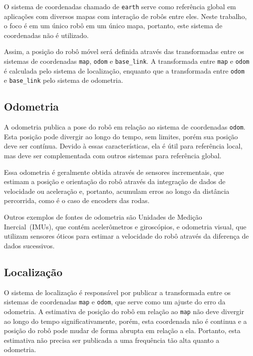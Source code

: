 \documentclass[repeatfields,xlists,xpacks,oneside,yearsonly]{ufrgscca}
\begin{document}
O sistema de coordenadas chamado de \texttt{earth} serve como
referência global em aplicações com diversos mapas com interação de
robôs entre eles. Neste trabalho, o foco é em um único robô em um
único mapa, portanto, este sistema de coordenadas não é utilizado.

Assim, a posição do robô móvel será definida através das
transformadas entre os sistemas de coordenadas \texttt{map},
\texttt{odom} e \texttt{base\_link}. A transformada entre
\texttt{map} e \texttt{odom} é calculada pelo sistema de localização,
enquanto que a transformada entre \texttt{odom} e \texttt{base\_link}
pelo sistema de odometria.


\subsection{Odometria}

A odometria publica a pose do robô em relação ao sistema de
coordenadas \texttt{odom}. Esta posição pode divergir ao longo do
tempo, sem limites, porém sua posição deve ser contínua. Devido à
essas características, ela é útil para referência local, mas deve ser
complementada com outros sistemas para referência global.

Essa odometria é geralmente obtida através de sensores incrementais,
que estimam a posição e orientação do robô através da integração de
dados de velocidade ou aceleração e, portanto, acumulam erros ao
longo da distância percorrida, como é o caso de encoders das rodas.

Outros exemplos de fontes de odometria são Unidades de Medição
Inercial~(IMUs), que contém acelerômetros e giroscópios, e odometria
visual, que utilizam sensores óticos para estimar a velocidade do
robô através da diferença de dados sucessivos.


\subsection{Localização}

O sistema de localização é responsável por publicar a transformada
entre os sistemas de coordenadas \texttt{map} e \texttt{odom}, que
serve como um ajuste do erro da odometria. A estimativa de posição do
robô em relação ao \texttt{map} não deve divergir ao longo do tempo
significativamente, porém, esta coordenada não é continua e a posição
do robô pode mudar de forma abrupta em relação a ela. Portanto, esta
estimativa não precisa ser publicada a uma frequência tão alta quanto
a odometria.
\end{document}
